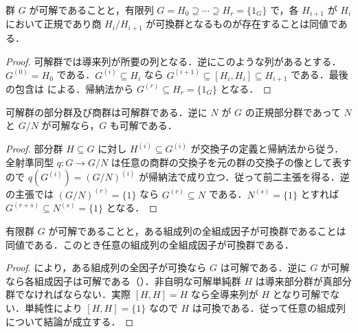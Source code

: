 \begin{prop}[可解性と可換商の列]
群 $G$ が可解であることと，有限列 $G=H_0\supseteq\cdots\supseteq H_r=\{1_G\}$ で，各 $H_{i+1}$ が $H_i$ において正規であり商 $H_i/H_{i+1}$ が可換群となるものが存在することは同値である．
\end{prop}
\begin{proof}
可解群では導来列が所要の列となる．逆にこのような列があるとする．$G^{(0)}=H_0$ である．$G^{(i)}\subseteq H_i$ なら $G^{(i+1)}\subseteq[H_i,H_i]\subseteq H_{i+1}$ である．最後の包含は  による．帰納法から $G^{(r)}\subseteq H_r=\{1_G\}$ となる．
\end{proof}
\begin{prop}[可解群の部分群と商群]
可解群の部分群及び商群は可解群である．逆に $N$ が $G$ の正規部分群であって $N$ と $G/N$ が可解なら，$G$ も可解である．
\end{prop}
\begin{proof}
部分群 $H\subseteq G$ に対し $H^{(i)}\subseteq G^{(i)}$ が交換子の定義と帰納法から従う．全射準同型 $q:G\to G/N$ は任意の商群の交換子を元の群の交換子の像として表すので $q(G^{(i)})=(G/N)^{(i)}$ が帰納法で成り立つ．従って前二主張を得る．逆の主張では $(G/N)^{(r)}=\{1\}$ なら $G^{(r)}\subseteq N$ である．$N^{(s)}=\{1\}$ とすれば $G^{(r+s)}\subseteq N^{(s)}=\{1\}$ となる．
\end{proof}
\begin{prop}[有限可解群の組成因子]
有限群 $G$ が可解であることと，ある組成列の全組成因子が可換群であることは同値である．このとき任意の組成列の全組成因子が可換群である．
\end{prop}
\begin{proof}
により，ある組成列の全因子が可換なら $G$ は可解である．逆に $G$ が可解なら各組成因子は可解である（）．非自明な可解単純群 $H$ は導来部分群が真部分群でなければならない．実際 $[H,H]=H$ なら全導来列が $H$ となり可解でない．単純性により $[H,H]=\{1\}$ なので $H$ は可換である．従って任意の組成列について結論が成立する．
\end{proof}
